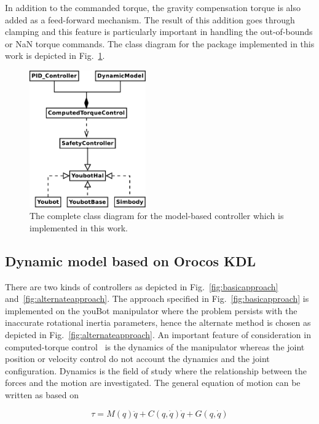 In addition to the commanded torque, the gravity compensation torque is also added as a feed-forward mechanism. The result of this addition goes through clamping and this feature is particularly important in handling the out-of-bounds or NaN torque commands. The class diagram for the package implemented in this work is depicted in Fig.~\ref{fig:classdiagram}.

\begin{figure}[h]
\centering
\includegraphics[width=50mm]{pictures/classdiagram_package.pdf}
\caption{The complete class diagram for the model-based controller which is implemented in this work.}
\label{fig:classdiagram}
\end{figure}

\subsection{Dynamic model based on Orocos KDL}

There are two kinds of controllers as depicted in Fig.~\ref{fig:basicapproach} and~\ref{fig:alternateapproach}. The approach specified in Fig.~\ref{fig:basicapproach} is implemented on the youBot manipulator where the problem persists with the inaccurate rotational inertia parameters, hence the alternate method is chosen as depicted in Fig.~\ref{fig:alternateapproach}. An important feature of consideration in computed-torque control~\cite{muggler2013torque} is the dynamics of the manipulator whereas the joint position or velocity control do not account the dynamics and the joint configuration. Dynamics is the field of study where the relationship between the forces and the motion are investigated. The general equation of motion can be written as based on~\cite{muggler2013torque}

\begin{equation}
\tau = M(q)\ddot{q} + C(q, \dot{q})\dot{q} + G(q, \dot{q})
\label{eq:dynamicmodel}
\end{equation}

